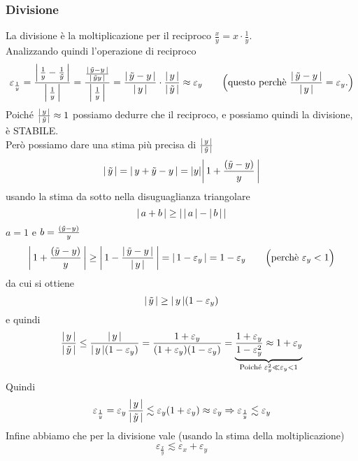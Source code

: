 \subsubsection{Divisione}
La divisione è la moltiplicazione per il reciproco $\frac{x}{y} = x \cdot \frac{1}{y}$.\\
Analizzando quindi l'operazione di reciproco
\[ \varepsilon_{\frac{1}{y}} = \frac{\abs*{\,\frac{1}{y} - \frac{1}{\Tilde{y}}\,} }{\abs*{\,\frac{1}{y}\,}} = \frac{\frac{\abs*{\,\Tilde{y} - y\,}}{\abs*{\,\Tilde{y}y\,}}}{\abs*{\,\frac{1}{y}\,}} = \frac{\abs*{\,\Tilde{y} - y\,}}{\abs*{\,y\,}} \cdot \frac{\abs*{\,y\,}}{\abs*{\,\Tilde{y}\,}} \approx \varepsilon_y \qquad \Bigl( \text{questo perchè } \frac{\abs*{\,\Tilde{y} - y\,}}{\abs*{\,y\,}} = \varepsilon_y . \Bigr)\]
Poiché $\frac{\lvert \,y\, \rvert}{\lvert \,\Tilde{y}\, \rvert} \approx 1$ possiamo dedurre che il reciproco, e possiamo quindi la divisione, è STABILE.\\
Però possiamo dare una stima più precisa di $\frac{\lvert \,y\, \rvert}{\lvert \,\Tilde{y}\, \rvert}$
\[ \abs{\,\Tilde{y}\,} = \abs{\,y + \Tilde{y} - y\,} = \abs{y}\abs*{\,1 + \frac{(\Tilde{y} - y)}{y}\,}\]
usando la stima da sotto nella disuguaglianza triangolare 
\[\abs{\, a + b\,} \ge \abs{\,\abs{\,a\,} - \abs{\,b\,}\,}\]
$a = 1$ e $b = \frac{(\Tilde{y} - y)}{y}$
\[\abs*{\,1 + \frac{(\Tilde{y} - y)}{y}\,} \ge \abs*{\,1 - \frac{\abs*{\,\Tilde{y} - y\,}}{\abs{\,y\,}}\,} = \abs*{\,1 - \varepsilon_y\,} = 1 - \varepsilon_y \qquad \Bigl( \text{perchè } \varepsilon_y < 1 \Bigr)\]
da cui si ottiene 
\[\abs{\,\Tilde{y}\,} \ge \abs{\,y\,}(1 - \varepsilon_y)\]
e quindi
\[\frac{\abs*{\,y\,}}{\abs*{\,\Tilde{y}\,}} \le \frac{\abs*{\,y\,}}{\abs{\,y\,}(1 - \varepsilon_y)} = \frac{1 + \varepsilon_y}{(1 + \varepsilon_y)(1 - \varepsilon_y)} = \underbrace{\frac{1 + \varepsilon_y}{1 - \varepsilon_y^2} \approx 1 + \varepsilon_y}_{\text{Poiché } \varepsilon_y^2 \ll \varepsilon_y < 1}\]
Quindi
\[\varepsilon_{\frac{1}{y}} = \varepsilon_y\,\frac{\abs{\,y\,}}{\abs{\,\Tilde{y}\,}} \lesssim \varepsilon_y (1 + \varepsilon_y) \approx \varepsilon_y \Rightarrow \varepsilon_{\frac{1}{y}} \lesssim \varepsilon_y\]
Infine abbiamo che per la divisione vale (usando la stima della moltiplicazione)
\[\varepsilon_{\frac{x}{y}} \lesssim \varepsilon_x+\varepsilon_y\]
